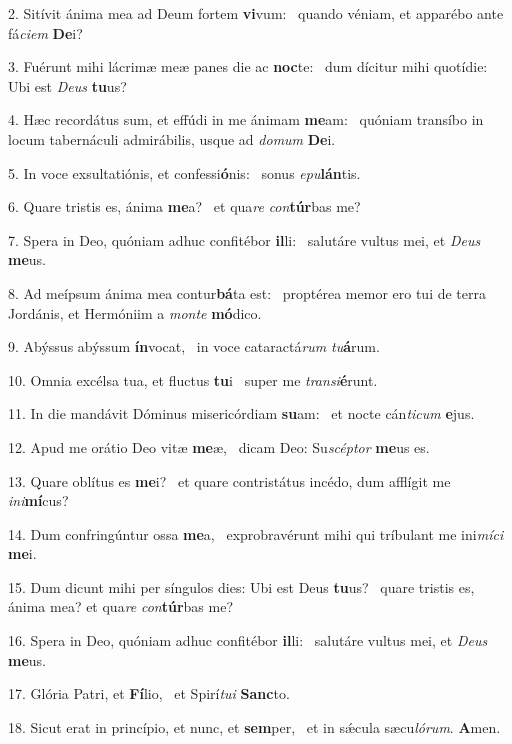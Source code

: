 2. Sitívit ánima mea ad Deum fortem \textbf{vi}vum: \ast\  quando véniam, et apparébo ante fá\textit{ci}\textit{em} \textbf{De}i?\

3. Fuérunt mihi lácrimæ meæ panes die ac \textbf{noc}te: \ast\  dum dícitur mihi quotídie: Ubi est \textit{De}\textit{us} \textbf{tu}us?\

4. Hæc recordátus sum, et effúdi in me ánimam \textbf{me}am: \ast\  quóniam transíbo in locum tabernáculi admirábilis, usque ad \textit{do}\textit{mum} \textbf{De}i.\

5. In voce exsultatiónis, et confessi\textbf{ó}nis: \ast\  sonus \textit{e}\textit{pu}\textbf{lán}tis.\

6. Quare tristis es, ánima \textbf{me}a? \ast\  et qua\textit{re} \textit{con}\textbf{túr}bas me?\

7. Spera in Deo, quóniam adhuc confitébor \textbf{il}li: \ast\  salutáre vultus mei, et \textit{De}\textit{us} \textbf{me}us.\

8. Ad meípsum ánima mea contur\textbf{bá}ta est: \ast\  proptérea memor ero tui de terra Jordánis, et Hermóniim a \textit{mon}\textit{te} \textbf{mó}dico.\

9. Abýssus abýssum \textbf{ín}vocat, \ast\  in voce cataractá\textit{rum} \textit{tu}\textbf{á}rum.\

10. Omnia excélsa tua, et fluctus \textbf{tu}i \ast\  super me \textit{trans}\textit{i}\textbf{é}runt.\

11. In die mandávit Dóminus misericórdiam \textbf{su}am: \ast\  et nocte cán\textit{ti}\textit{cum} \textbf{e}jus.\

12. Apud me orátio Deo vitæ \textbf{me}æ, \ast\  dicam Deo: Su\textit{scép}\textit{tor} \textbf{me}us es.\

13. Quare oblítus es \textbf{me}i? \ast\  et quare contristátus incédo, dum afflígit me \textit{in}\textit{i}\textbf{mí}cus?\

14. Dum confringúntur ossa \textbf{me}a, \ast\  exprobravérunt mihi qui tríbulant me ini\textit{mí}\textit{ci} \textbf{me}i.\

15. Dum dicunt mihi per síngulos dies: Ubi est Deus \textbf{tu}us? \ast\  quare tristis es, ánima mea? et qua\textit{re} \textit{con}\textbf{túr}bas me?\

16. Spera in Deo, quóniam adhuc confitébor \textbf{il}li: \ast\  salutáre vultus mei, et \textit{De}\textit{us} \textbf{me}us.\

17. Glória Patri, et \textbf{Fí}lio, \ast\  et Spirí\textit{tu}\textit{i} \textbf{Sanc}to.\

18. Sicut erat in princípio, et nunc, et \textbf{sem}per, \ast\  et in sǽcula sæcu\textit{ló}\textit{rum}. \textbf{A}men.\

